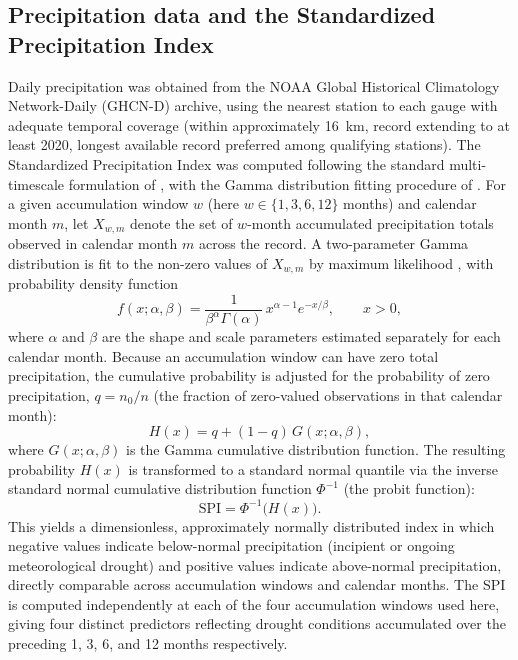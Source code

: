 \documentclass[preprint,12pt]{elsarticle}
\begin{document}
\subsection{Precipitation data and the Standardized Precipitation Index}
Daily precipitation was obtained from the NOAA Global Historical Climatology Network-Daily (GHCN-D) archive, using the nearest station to each gauge with adequate temporal coverage (within approximately 16~km, record extending to at least 2020, longest available record preferred among qualifying stations). The Standardized Precipitation Index \citep[SPI;][]{mckee1993spi} was computed following the standard multi-timescale formulation of \citet{edwards1997characteristics}, with the Gamma distribution fitting procedure of \citet{thom1958gamma}. For a given accumulation window $w$ (here $w \in \{1,3,6,12\}$ months) and calendar month $m$, let $X_{w,m}$ denote the set of $w$-month accumulated precipitation totals observed in calendar month $m$ across the record. A two-parameter Gamma distribution is fit to the non-zero values of $X_{w,m}$ by maximum likelihood \citep{thom1958gamma}, with probability density function
\begin{equation}
f(x;\alpha,\beta) = \frac{1}{\beta^{\alpha}\Gamma(\alpha)}\, x^{\alpha-1} e^{-x/\beta}, \qquad x>0,
\label{eq:gamma}
\end{equation}
where $\alpha$ and $\beta$ are the shape and scale parameters estimated separately for each calendar month. Because an accumulation window can have zero total precipitation, the cumulative probability is adjusted for the probability of zero precipitation, $q = n_0/n$ (the fraction of zero-valued observations in that calendar month):
\begin{equation}
H(x) = q + (1-q)\,G(x;\alpha,\beta),
\label{eq:spicdf}
\end{equation}
where $G(x;\alpha,\beta)$ is the Gamma cumulative distribution function. The resulting probability $H(x)$ is transformed to a standard normal quantile via the inverse standard normal cumulative distribution function $\Phi^{-1}$ (the probit function):
\begin{equation}
\mathrm{SPI} = \Phi^{-1}\big(H(x)\big).
\label{eq:spi}
\end{equation}
This yields a dimensionless, approximately normally distributed index in which negative values indicate below-normal precipitation (incipient or ongoing meteorological drought) and positive values indicate above-normal precipitation, directly comparable across accumulation windows and calendar months. The SPI is computed independently at each of the four accumulation windows used here, giving four distinct predictors reflecting drought conditions accumulated over the preceding 1, 3, 6, and 12 months respectively.
\end{document}
